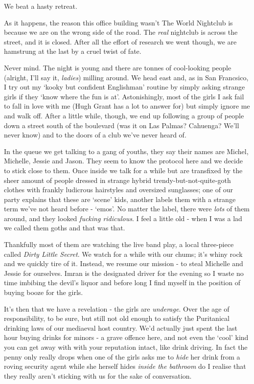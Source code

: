 \documentclass[a5paper,titlepage,11pt]{book}
\begin{document}
We beat a hasty retreat.

As it happens, the reason this office building wasn't The World Nightclub is because we are on the wrong side of the road.  The \emph{real} nightclub is across the street, and it is closed.  After all the effort of research we went though, we are hamstrung at the last by a cruel twist of fate.

Never mind.  The night is young and there are tonnes of cool-looking people (alright, I'll say it, \emph{ladies}) milling around.  We head east and, as in San Francsico, I try out my `kooky but confident Englishman' routine by simply asking strange girls if they `know where the fun is at'.  Astonishingly, most of the girls I ask fail to fall in love with me (Hugh Grant has a lot to answer for) but simply ignore me and walk off.  After a little while, though, we end up following a group of people down a street south of the boulevard (was it on Las Palmas?  Cahuenga?  We'll never know) and to the doors of a club we've never heard of.

In the queue we get talking to a gang of youths, they say their names are Michel, Michelle, Jessie and Jason.  They seem to know the protocol here and we decide to stick close to them.  Once inside we talk for a while but are transfixed by the sheer amount of people dressed in strange hybrid trendy-but-not-quite-goth clothes with frankly ludicrous hairstyles and oversized sunglasses; one of our party explains that these are `scene' kids, another labels them with a strange term we've not heard before - `emos'.  No matter the label, there were \emph{lots} of them around, and they looked \emph{fucking ridiculous}.  I feel a little old - when I was a lad we called them goths and that was that.

Thankfully most of them are watching the live band play, a local three-piece called \emph{Dirty Little Secret}.  We watch for a while with our chums; it's whiny rock and we quickly tire of it.  Instead, we resume our mission - to steal Michelle and Jessie for ourselves.  Imran is the designated driver for the evening so I waste no time imbibing the devil's liquor and before long I find myself in the position of buying booze for the girls.

It's then that we have a revelation - the girls are \emph{underage}.  Over the age of responsibility, to be sure, but still not old enough to satisfy the Puritanical drinking laws of our mediaeval host country.  We'd actually just spent the last hour buying drinks for minors - a grave offence here, and not even the `cool' kind you can get away with with your reputation intact, like drink driving.  In fact the penny only really drops when one of the girls asks me to \emph{hide} her drink from a roving security agent while she herself hides \emph{inside the bathroom} do I realise that they really aren't sticking with us for the sake of conversation.
\end{document}
